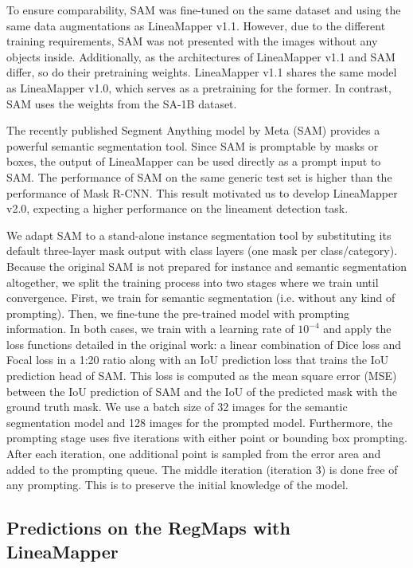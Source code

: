To ensure comparability, SAM was fine-tuned on the same dataset and using the same data augmentations as LineaMapper v1.1. However, due to the different training requirements, SAM was not presented with the images without any objects inside. Additionally, as the architectures of LineaMapper v1.1 and SAM differ, so do their pretraining weights. LineaMapper v1.1 shares the same model as LineaMapper v1.0, which serves as a pretraining for the former. In contrast, SAM uses the weights from the SA-1B dataset.

The recently published Segment Anything model by Meta (SAM) provides a powerful semantic segmentation tool. Since SAM is promptable by masks or boxes, the output of LineaMapper can be used directly as a prompt input to SAM. The performance of SAM on the same generic test set is higher than the performance of Mask R-CNN. This result motivated us to develop LineaMapper v2.0, expecting a higher performance on the lineament detection task.

We adapt SAM to a stand-alone instance segmentation tool by substituting its default three-layer mask output with class layers (one mask per class/category). Because the original SAM is not prepared for instance and semantic segmentation altogether, we split the training process into two stages where we train until convergence. First, we train for semantic segmentation (i.e. without any kind of prompting). Then, we fine-tune the pre-trained model with prompting information. In both cases, we train with a learning rate of $10^{-4}$ and apply the loss functions detailed in the original work: a linear combination of Dice loss and Focal loss in a 1:20 ratio along with an IoU prediction loss that trains the IoU prediction head of SAM. This loss is computed as the mean square error (MSE) between the IoU prediction of SAM and the IoU of the predicted mask with the ground truth mask. We use a batch size of 32 images for the semantic segmentation model and 128 images for the prompted model. Furthermore, the prompting stage uses five iterations with either point or bounding box prompting. After each iteration, one additional point is sampled from the error area and added to the prompting queue. The middle iteration (iteration 3) is done free of any prompting. This is to preserve the initial knowledge of the model.

\subsection{Predictions on the RegMaps with LineaMapper}\label{sec:assembling_preds}

